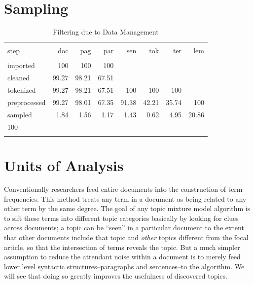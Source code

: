\documentclass[]{book}
\theoremstyle{definition}
\theoremstyle{definition}
\theoremstyle{definition}
\theoremstyle{remark}
\begin{document}
\hypertarget{kd-dp1}{%
\section{Sampling}\label{kd-dp1}}

\begin{table}[!htbp] \centering 
  \caption{Filtering due to Data Management} 
  \label{tab:filt} 
\begin{tabular}{@{\extracolsep{5pt}} lrrrrrrr} 
\\[-1.8ex]\hline 
\hline \\[-1.8ex] 
step & doc & pag & par & sen & tok & ter & lem \\ 
\hline \\[-1.8ex] 
imported & 100 & 100 & 100 &  &  &  &  \\ 
cleaned & 99.27 & 98.21 & 67.51 &  &  &  &  \\ 
tokenized & 99.27 & 98.21 & 67.51 & 100 & 100 & 100 &  \\ 
preprocessed & 99.27 & 98.01 & 67.35 & 91.38 & 42.21 & 35.74 & 100 \\ 
sampled & 1.84 & 1.56 & 1.17 & 1.43 & 0.62 & 4.95 & 20.86 \\ 
100\\%
\hline \\[-1.8ex] 
\end{tabular} 
\end{table}

\hypertarget{units-of-analysis}{%
\section{Units of Analysis}\label{units-of-analysis}}

Conventionally researchers feed entire documents into the construction
of term frequencies. This method treats any term in a document as being
related to any other term by the same degree. The goal of any topic
mixture model algorithm is to sift these terms into different topic
categories basically by looking for clues across documents; a topic can
be ``seen'' in a particular document to the extent that other documents
include that topic and \emph{other} topics different from the focal
article, so that the intersection of terms reveals the topic. But a much
simpler assumption to reduce the attendant noise within a document is to
merely feed lower level syntactic structures--paragraphs and
sentences--to the algorithm. We will see that doing so greatly improves
the usefulness of discovered topics.
\end{document}
